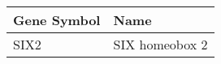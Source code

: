 \begin{tabular}{ll}
\toprule
Gene Symbol &           Name \\
\midrule
       SIX2 & SIX homeobox 2 \\
\bottomrule
\end{tabular}
